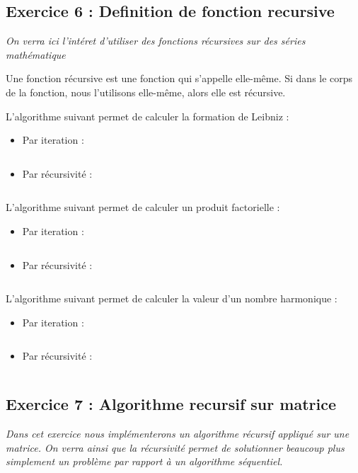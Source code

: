 \subsection{Exercice 6 : Definition de fonction recursive}
\textit{On verra ici l'intéret d'utiliser des fonctions récursives sur des séries mathématique}

Une fonction récursive est une fonction qui s'appelle elle-même. Si dans le corps de la fonction, nous l'utilisons elle-même, alors elle est récursive.

L'algorithme suivant permet de calculer la formation de Leibniz :

\begin{itemize}
\item Par iteration :
\inputminted[linenos,firstline=7, lastline=14]{cpp}{../sources/cpp/TP1-2/piLeibniz.c}
\item Par récursivité :
\inputminted[linenos,firstline=16, lastline=19]{cpp}{../sources/cpp/TP1-2/piLeibniz.c}
\end{itemize}

L'algorithme suivant permet de calculer un produit factorielle :

\begin{itemize}
\item Par iteration :
\inputminted[linenos,firstline=7, lastline=14]{cpp}{../sources/cpp/TP1-2/factorielle.c}
\item Par récursivité :
\inputminted[linenos,firstline=16, lastline=21]{cpp}{../sources/cpp/TP1-2/factorielle.c}
\end{itemize}

L'algorithme suivant permet de calculer la valeur d'un nombre harmonique :

\begin{itemize}
\item Par iteration :
\inputminted[linenos,firstline=7, lastline=14]{cpp}{../sources/cpp/TP1-2/harmonique.c}
\item Par récursivité :
\inputminted[linenos,firstline=16, lastline=21]{cpp}{../sources/cpp/TP1-2/harmonique.c}
\end{itemize}

\subsection{Exercice 7 : Algorithme recursif sur matrice}
\textit{Dans cet exercice nous implémenterons un algorithme récursif appliqué sur une matrice. On verra ainsi que la récursivité permet de solutionner beaucoup plus simplement un problème par rapport à un algorithme séquentiel.}

